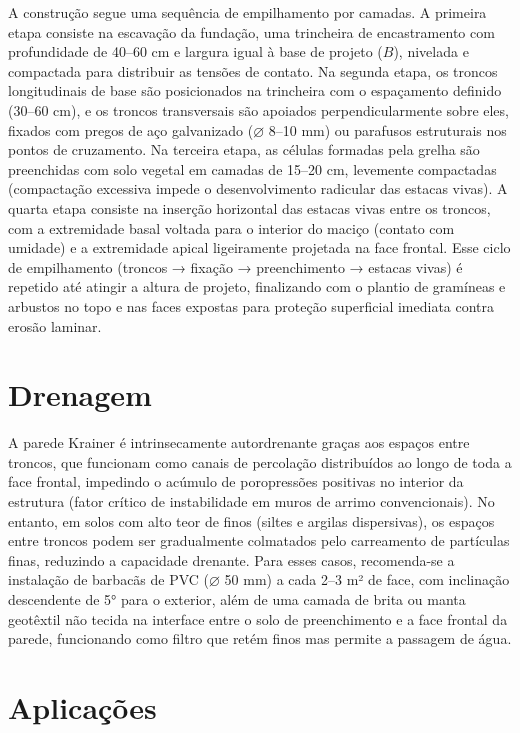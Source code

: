 \documentclass[
  portuguese,
  11pt,
  a4paper,
  open=any]{scrbook}
\begin{document}
A construção segue uma sequência de empilhamento por camadas. A primeira
etapa consiste na escavação da fundação, uma trincheira de encastramento
com profundidade de 40--60 cm e largura igual à base de projeto (\(B\)),
nivelada e compactada para distribuir as tensões de contato. Na segunda
etapa, os troncos longitudinais de base são posicionados na trincheira
com o espaçamento definido (30--60 cm), e os troncos transversais são
apoiados perpendicularmente sobre eles, fixados com pregos de aço
galvanizado (\(\varnothing\) 8--10 mm) ou parafusos estruturais nos
pontos de cruzamento. Na terceira etapa, as células formadas pela grelha
são preenchidas com solo vegetal em camadas de 15--20 cm, levemente
compactadas (compactação excessiva impede o desenvolvimento radicular
das estacas vivas). A quarta etapa consiste na inserção horizontal das
estacas vivas entre os troncos, com a extremidade basal voltada para o
interior do maciço (contato com umidade) e a extremidade apical
ligeiramente projetada na face frontal. Esse ciclo de empilhamento
(troncos → fixação → preenchimento → estacas vivas) é repetido até
atingir a altura de projeto, finalizando com o plantio de gramíneas e
arbustos no topo e nas faces expostas para proteção superficial imediata
contra erosão laminar.

\section{Drenagem}\label{drenagem}

A parede Krainer é intrinsecamente autordrenante graças aos espaços
entre troncos, que funcionam como canais de percolação distribuídos ao
longo de toda a face frontal, impedindo o acúmulo de poropressões
positivas no interior da estrutura (fator crítico de instabilidade em
muros de arrimo convencionais). No entanto, em solos com alto teor de
finos (siltes e argilas dispersivas), os espaços entre troncos podem ser
gradualmente colmatados pelo carreamento de partículas finas, reduzindo
a capacidade drenante. Para esses casos, recomenda-se a instalação de
barbacãs de PVC (\(\varnothing\) 50 mm) a cada 2--3 m² de face, com
inclinação descendente de 5° para o exterior, além de uma camada de
brita ou manta geotêxtil não tecida na interface entre o solo de
preenchimento e a face frontal da parede, funcionando como filtro que
retém finos mas permite a passagem de água.

\section{Aplicações}\label{aplicauxe7uxf5es-1}
\end{document}
